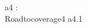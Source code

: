 
\begin{circus}
\circchannel a4 : \nat \\
\circprocess Roadtocoverage4 \circdef \circbegin
	\circspot a4.1 \then \Skip \\
	\circend
\end{circus}
